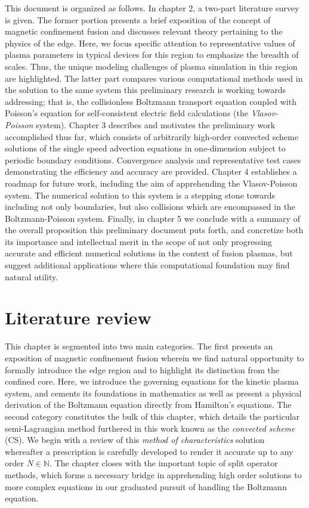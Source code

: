 \documentclass[11pt,titlepage]{report}
\begin{document}
\indent This document is organized as follows. In chapter 2, a two-part literature survey is given. The former portion presents a brief exposition of the concept of magnetic confinement fusion and discusses relevant theory pertaining to the physics of the edge. Here, we focus specific attention to representative values of plasma parameters in typical devices for this region to emphasize the breadth of scales. Thus, the unique modeling challenges of plasma simulation in this region are highlighted. The latter part compares various computational methods used in the solution to the same system this preliminary research is working towards addressing; that is, the collisionless Boltzmann transport equation coupled with Poisson's equation for self-consistent electric field calculations (the \emph{Vlasov-Poisson} system). Chapter 3 describes and motivates the preliminary work accomplished thus far, which consists of arbitrarily high-order convected scheme solutions of the single speed advection equations in one-dimension subject to periodic boundary conditions. Convergence analysis and representative test cases demonstrating the efficiency and accuracy are provided. Chapter 4 establishes a roadmap for future work, including the aim of apprehending the Vlasov-Poisson system. The numerical solution to this system is a stepping stone towards including not only boundaries, but also collisions which are encompassed in the Boltzmann-Poisson system. Finally, in chapter 5 we conclude with a summary of the overall proposition this preliminary document puts forth, and concretize both its importance and intellectual merit in the scope of not only progressing accurate and efficient numerical solutions in the context of fusion plasmas, but suggest additional applications where this computational foundation may find natural utility.


\chapter{Literature review}\label{chap:Literature_review}

\indent \indent This chapter is segmented into two main categories. The first presents an exposition of magnetic confinement fusion wherein we find natural opportunity to formally introduce the edge region and to highlight its distinction from the confined core. Here, we introduce the governing equations for the kinetic plasma system, and cements its foundations in mathematics as well as present a physical derivation of the Boltzmann equation directly from Hamilton's equations. The second category constitutes the bulk of this chapter, which details the particular semi-Lagrangian method furthered in this work known as the \emph{convected scheme} (CS). We begin with a review of this \emph{method of characteristics} solution whereafter a prescription is carefully developed to render it accurate up to any order $N\in\mathbb{N}$. The chapter closes with the important topic of split operator methods, which forms a necessary bridge in apprehending high order solutions to more complex equations in our graduated pursuit of handling the Boltzmann equation.
\end{document}
